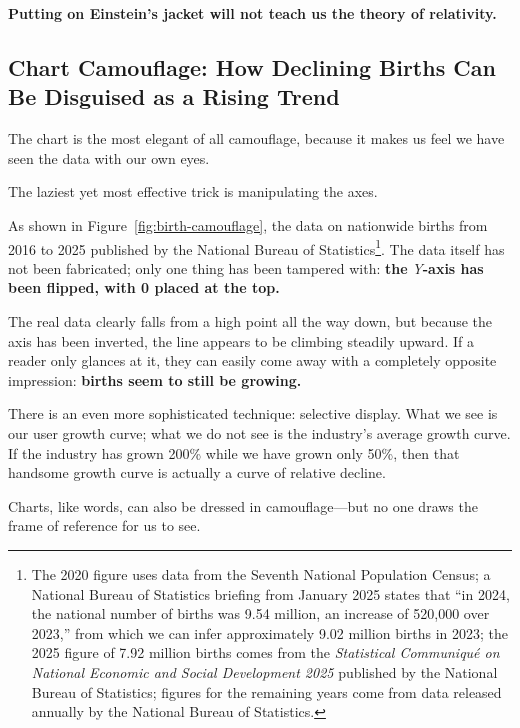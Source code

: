 \textbf{Putting on Einstein's jacket will not teach us the theory of relativity.}


\newpage
\subsection{Chart Camouflage: How Declining Births Can Be Disguised as a Rising Trend}

The chart is the most elegant of all camouflage, because it makes us feel we have seen the data with our own eyes.

The laziest yet most effective trick is manipulating the axes.

\vspace{1em}

As shown in Figure~\ref{fig:birth-camouflage}, the data on nationwide births from 2016 to 2025 published by the National Bureau of Statistics\footnote{The 2020 figure uses data from the Seventh National Population Census; a National Bureau of Statistics briefing from January 2025 states that ``in 2024, the national number of births was 9.54 million, an increase of 520,000 over 2023,'' from which we can infer approximately 9.02 million births in 2023; the 2025 figure of 7.92 million births comes from the \textit{Statistical Communiqu\'e on National Economic and Social Development 2025} published by the National Bureau of Statistics; figures for the remaining years come from data released annually by the National Bureau of Statistics.}.
The data itself has not been fabricated; only one thing has been tampered with: \textbf{the} \textit{Y}\textbf{-axis has been flipped, with 0 placed at the top.}



The real data clearly falls from a high point all the way down, but because the axis has been inverted, the line appears to be climbing steadily upward.
If a reader only glances at it, they can easily come away with a completely opposite impression: \textbf{births seem to still be growing.}

There is an even more sophisticated technique: selective display.
What we see is our user growth curve; what we do not see is the industry's average growth curve.
If the industry has grown 200\% while we have grown only 50\%, then that handsome growth curve is actually a curve of relative decline.

\begin{importantbox}
Charts, like words, can also be dressed in camouflage---but no one draws the frame of reference for us to see.
\end{importantbox}

